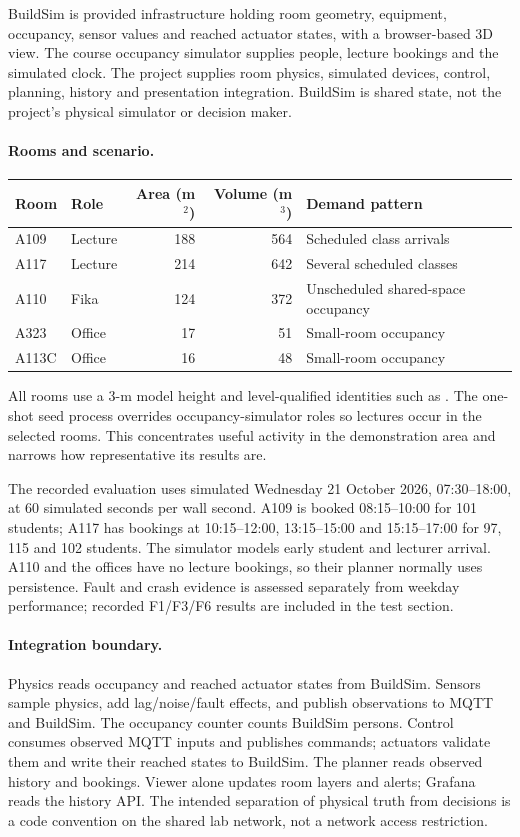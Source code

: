 \documentclass[11pt,a4paper]{article}
\begin{document}
BuildSim is provided infrastructure holding room geometry, equipment, occupancy, sensor values and reached actuator states, with a browser-based 3D view. The course occupancy simulator supplies people, lecture bookings and the simulated clock. The project supplies room physics, simulated devices, control, planning, history and presentation integration. BuildSim is shared state, not the project's physical simulator or decision maker.

\paragraph{Rooms and scenario.}\mbox{}\par
\noindent\begin{tabularx}{\linewidth}{llrrX}\toprule Room & Role & Area (m$^2$) & Volume (m$^3$) & Demand pattern\\\midrule
A109 & Lecture & 188 & 564 & Scheduled class arrivals\\
A117 & Lecture & 214 & 642 & Several scheduled classes\\
A110 & Fika & 124 & 372 & Unscheduled shared-space occupancy\\
A323 & Office & 17 & 51 & Small-room occupancy\\
A113C & Office & 16 & 48 & Small-room occupancy\\\bottomrule\end{tabularx}
All rooms use a 3-m model height and level-qualified identities such as \protect{}. The one-shot seed process overrides occupancy-simulator roles so lectures occur in the selected rooms. This concentrates useful activity in the demonstration area and narrows how representative its results are.

The recorded evaluation uses simulated Wednesday 21 October 2026, 07:30--18:00, at 60 simulated seconds per wall second. A109 is booked 08:15--10:00 for 101 students; A117 has bookings at 10:15--12:00, 13:15--15:00 and 15:15--17:00 for 97, 115 and 102 students. The simulator models early student and lecturer arrival. A110 and the offices have no lecture bookings, so their planner normally uses persistence. Fault and crash evidence is assessed separately from weekday performance; recorded F1/F3/F6 results are included in the test section.

\paragraph{Integration boundary.}
Physics reads occupancy and reached actuator states from BuildSim. Sensors sample physics, add lag/noise/fault effects, and publish observations to MQTT and BuildSim. The occupancy counter counts BuildSim persons. Control consumes observed MQTT inputs and publishes commands; actuators validate them and write their reached states to BuildSim. The planner reads observed history and bookings. Viewer alone updates room layers and alerts; Grafana reads the history API. The intended separation of physical truth from decisions is a code convention on the shared lab network, not a network access restriction.
\end{document}
